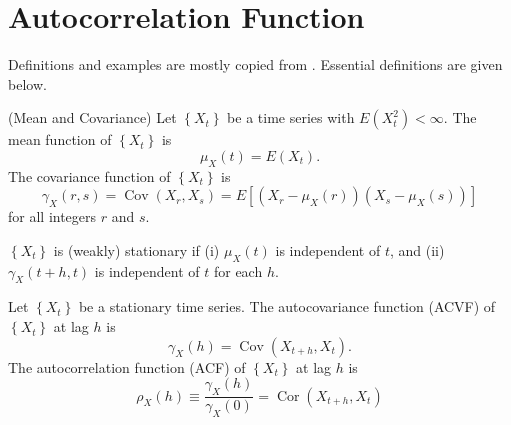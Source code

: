\section{Autocorrelation Function}

Definitions and examples are mostly copied from \cite{brockwellIntroductionTimeSeries2016}. Essential definitions are given below.

\begin{definition}(Mean and Covariance)
Let $\left\{X_t\right\}$ be a time series with $E\left(X_t^2\right)<\infty$. The mean function of $\left\{X_t\right\}$ is
\[
\mu_X(t)=E\left(X_t\right) .
\]
The covariance function of $\left\{X_t\right\}$ is
\[
\gamma_X(r, s)=\operatorname{Cov}\left(X_r, X_s\right)=E\left[\left(X_r-\mu_X(r)\right)\left(X_s-\mu_X(s)\right)\right]
\]
for all integers $r$ and $s$.
\end{definition}

\begin{definition}
	$\left\{X_t\right\}$ is (weakly) stationary if
(i) $\mu_X(t)$ is independent of $t$, and
(ii) $\gamma_X(t+h, t)$ is independent of $t$ for each $h$.
\end{definition}

\begin{definition}
	Let $\left\{X_t\right\}$ be a stationary time series. The autocovariance function (ACVF) of $\left\{X_t\right\}$ at lag $h$ is
\[
\gamma_X(h)=\operatorname{Cov}\left(X_{t+h}, X_t\right) .
\]
The autocorrelation function (ACF) of $\left\{X_t\right\}$ at lag $h$ is
\[
\rho_X(h) \equiv \frac{\gamma_X(h)}{\gamma_X(0)}=\operatorname{Cor}\left(X_{t+h}, X_t\right)
\]
\end{definition}


